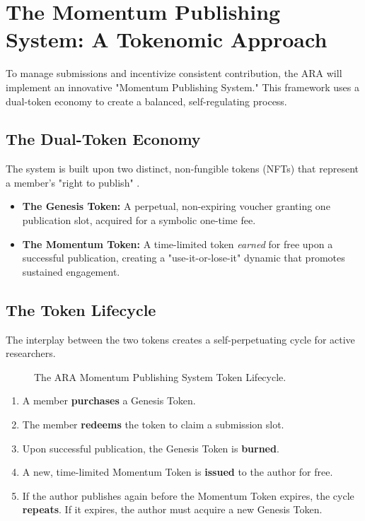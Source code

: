 \documentclass[conference, compsoc, 11pt]{IEEEtran}
\begin{document}
\section{The Momentum Publishing System: A Tokenomic Approach}

To manage submissions and incentivize consistent contribution, the ARA will implement an innovative "Momentum Publishing System." This framework uses a dual-token economy to create a balanced, self-regulating process.

\subsection{The Dual-Token Economy}
The system is built upon two distinct, non-fungible tokens (NFTs) that represent a member's "right to publish" \cite{entriken2018, wang2021}.
\begin{itemize}
    \item \textbf{The Genesis Token:} A perpetual, non-expiring voucher granting one publication slot, acquired for a symbolic one-time fee.
    \item \textbf{The Momentum Token:} A time-limited token \textit{earned} for free upon a successful publication, creating a "use-it-or-lose-it" dynamic that promotes sustained engagement.
\end{itemize}

\subsection{The Token Lifecycle}
The interplay between the two tokens creates a self-perpetuating cycle for active researchers.

\begin{figure}[!t]
\centering
{}
\caption{The ARA Momentum Publishing System Token Lifecycle.}
\label{fig_token_lifecycle}
\end{figure}

\begin{enumerate}
    \item A member \textbf{purchases} a Genesis Token.
    \item The member \textbf{redeems} the token to claim a submission slot.
    \item Upon successful publication, the Genesis Token is \textbf{burned}.
    \item A new, time-limited Momentum Token is \textbf{issued} to the author for free.
    \item If the author publishes again before the Momentum Token expires, the cycle \textbf{repeats}. If it expires, the author must acquire a new Genesis Token.
\end{enumerate}
\end{document}
